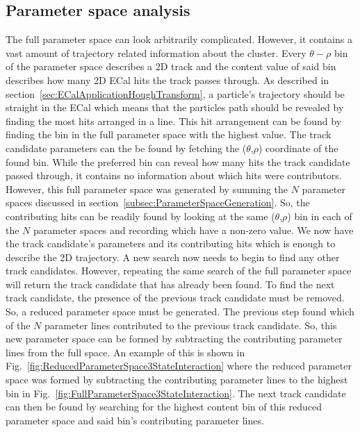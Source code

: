 \subsection{Parameter space analysis}
\label{subsec:ParameterSpaceAnalysis}
The full parameter space can look arbitrarily complicated. However, it contains a vast amount of trajectory related information about the cluster.  Every $\theta-\rho$ bin of the parameter space describes a 2D track and the content value of said bin describes how many 2D ECal hits the track passes through.  As described in section~\ref{sec:ECalApplicationHoughTransform}, a particle's trajectory should be straight in the ECal which means that the particles path should be revealed by finding the most hits arranged in a line.  This hit arrangement can be found by finding the bin in the full parameter space with the highest value.  The track candidate parameters can the be found by fetching the ($\theta$,$\rho$) coordinate of the found bin.
\newline
\newline
While the preferred bin can reveal how many hits the track candidate passed through, it contains no information about which hits were contributors.  However, this full parameter space was generated by summing the $N$ parameter spaces discussed in section~\ref{subsec:ParameterSpaceGeneration}.  So, the contributing hits can be readily found by looking at the same ($\theta$,$\rho$) bin in each of the $N$ parameter spaces and recording which have a non-zero value.  We now have the track candidate's parameters and its contributing hits which is enough to describe the 2D trajectory.
\newline
\newline
A new search now needs to begin to find any other track candidates.  However, repeating the same search of the full parameter space will return the track candidate that has already been found.  To find the next track candidate, the presence of the previous track candidate must be removed.  So, a reduced parameter space must be generated. The previous step found which of the $N$ parameter lines contributed to the previous track candidate.  So, this new parameter space can be formed by subtracting the contributing parameter lines from the full space.  An example of this is shown in Fig.~\ref{fig:ReducedParameterSpace3StateInteraction} where the reduced parameter space was formed by subtracting the contributing parameter lines to the highest bin in Fig.~\ref{fig:FullParameterSpace3StateInteraction}.  The next track candidate can then be found by searching for the highest content bin of this reduced parameter space and said bin's contributing parameter lines. 
